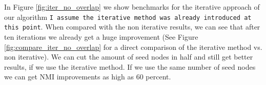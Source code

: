 In Figure \ref{fig:iter_no_overlap} we show benchmarks for the iterative approach of our algorithm \texttt{I assume the iterative method was already introduced at this point}. When compared with the non iterative results, we can see that after ten iterations we already get a huge improvement (See Figure \ref{fig:compare_iter_no_overlap} for a direct comparison of the iterative method vs. non iterative). We can cut the amount of seed nodes in half and still get better results, if we use the iterative method. If we use the same number of seed nodes we can get NMI improvements as high as $60$ percent.